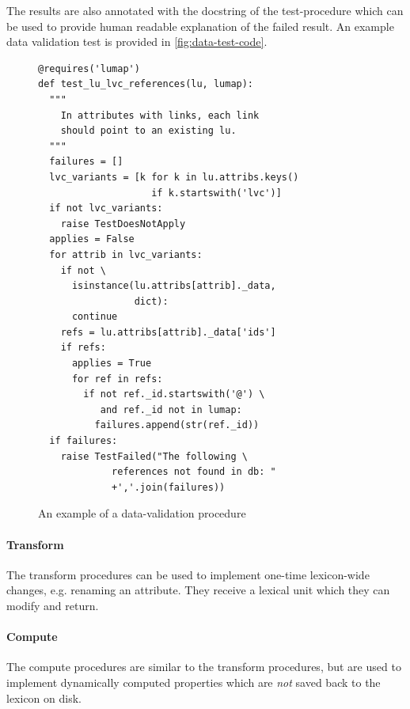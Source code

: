 \documentclass[10pt, a4paper]{article}
\newcommand{\rrr}[1]{{\color{red} REVIEWER: #1}}
\begin{document}
The results are also annotated with the docstring of the test-procedure which can be used to provide human
readable explanation of the failed result. An example data validation test is provided in \autoref{fig:data-test-code}.
\begin{figure}
\small
% 
% 
% 
\begin{verbatim}
@requires('lumap')
def test_lu_lvc_references(lu, lumap):
  """
    In attributes with links, each link
    should point to an existing lu.
  """
  failures = []
  lvc_variants = [k for k in lu.attribs.keys()
                    if k.startswith('lvc')]
  if not lvc_variants:
    raise TestDoesNotApply
  applies = False
  for attrib in lvc_variants:
    if not \
      isinstance(lu.attribs[attrib]._data,
                 dict):
      continue
    refs = lu.attribs[attrib]._data['ids']
    if refs:
      applies = True
      for ref in refs:
        if not ref._id.startswith('@') \
           and ref._id not in lumap:
          failures.append(str(ref._id))
  if failures:
    raise TestFailed("The following \
             references not found in db: "
             +','.join(failures))
\end{verbatim}

\caption{\label{fig:data-test-code}An example of a data-validation procedure}
\end{figure}

\paragraph{Transform} The transform procedures can be used to implement one-time lexicon-wide changes, e.g.
renaming an attribute. They receive a lexical unit which they can modify and return.

\paragraph{Compute}\label{sec:computed} The compute procedures are similar to the transform procedures, but are used to implement dynamically computed properties which are \emph{not} saved back to the lexicon on disk.
\end{document}
